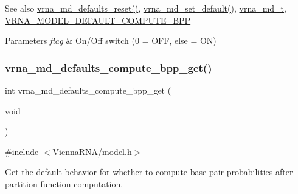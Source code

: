 \begin{DoxySeeAlso}{See also}
\hyperlink{group__model__details_ga70834424cf804d149937de89f80ceb45}{vrna\+\_\+md\+\_\+defaults\+\_\+reset()}, \hyperlink{group__model__details_ga8ac6ff84936282436f822644bf841f66}{vrna\+\_\+md\+\_\+set\+\_\+default()}, \hyperlink{group__model__details_ga1f8a10e12a0a1915f2a4eff0b28ea17c}{vrna\+\_\+md\+\_\+t}, \hyperlink{group__model__details_ga1d6cd5051940b126c248147c011bac6c}{V\+R\+N\+A\+\_\+\+M\+O\+D\+E\+L\+\_\+\+D\+E\+F\+A\+U\+L\+T\+\_\+\+C\+O\+M\+P\+U\+T\+E\+\_\+\+B\+PP} 
\end{DoxySeeAlso}

\begin{DoxyParams}{Parameters}
{\em flag} & On/\+Off switch (0 = O\+FF, else = ON) \\
\hline
\end{DoxyParams}
\mbox{\label{group__model__details_gaa3a537e61fbe0518673bf9f73fd820f3}} 
\subsubsection{\texorpdfstring{vrna\+\_\+md\+\_\+defaults\+\_\+compute\+\_\+bpp\+\_\+get()}{vrna\_md\_defaults\_compute\_bpp\_get()}}
{\footnotesize\ttfamily int vrna\+\_\+md\+\_\+defaults\+\_\+compute\+\_\+bpp\+\_\+get (\begin{DoxyParamCaption}\item[{void}]{ }\end{DoxyParamCaption})}



{\ttfamily \#include $<$\hyperlink{model_8h}{Vienna\+R\+N\+A/model.\+h}$>$}



Get the default behavior for whether to compute base pair probabilities after partition function computation. 

